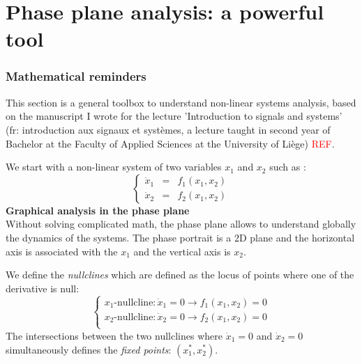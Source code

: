 \newpage
%
%
%
%

\section{Phase plane analysis: a powerful tool}
\subsubsection{Mathematical reminders}
This section is a general toolbox to understand non-linear systems analysis, based on the manuscript I wrote for the lecture 'Introduction to signals and systems' (fr: introduction aux signaux et systèmes, a lecture taught in second year of Bachelor at the Faculty of Applied Sciences at the University of Liège) \textcolor{red}{REF}. 

We start with a non-linear system of two variables $x_1$ and $x_2$ such as : 
\begin{equation*}
\left\{
    \begin{array}{lllllll}
        \dot{x}_1 &=& f_1(x_1,x_2)\\
        \dot{x}_2 &=& f_2(x_1,x_2) 
    \end{array}
\right.
\end{equation*}
\textbf{Graphical analysis in the phase plane}\\
Without solving complicated math, the phase plane allows to understand globally the dynamics of the systems. The phase portrait is a 2D plane and the horizontal axis is associated with the $x_1$ and the vertical axis is $x_2$.

We define the \textit{nullclines} which are defined as the locus of points where one of the derivative is null:
\begin{equation*}
\left\{
    \begin{array}{lllllll}
        x_1\mbox{-nullcline}: \dot{x}_1 =0 \rightarrow f_1(x_1,x_2) = 0  \\
        x_2\mbox{-nullcline}: \dot{x}_2 =0 \rightarrow f_2(x_1,x_2) = 0 \\
    \end{array}
\right.
\end{equation*}
The intersections between the two nullclines where $\dot{x}_1=0$ and $\dot{x}_2=0$ simultaneously defines the \textit{fixed points}: $(x_1^*,x_2^*)$. 

